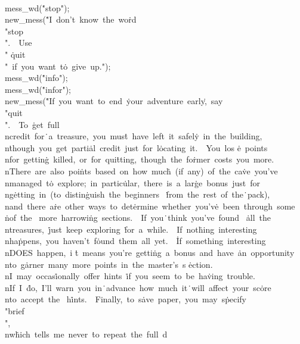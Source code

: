 \\{mess\_wd}(\.{"stop"});\6
\\{new\_mess}(\.{"I\ don't\ know\ the\ wo}\)\.{rd\ \\"stop\\".\ \ Use\ \\"}\)%
\.{quit\\"\ if\ you\ want\ t}\)\.{o\ give\ up."});\6
\\{mess\_wd}(\.{"info"});\5
\\{mess\_wd}(\.{"infor"});\6
\\{new\_mess}(\.{"If\ you\ want\ to\ end\ }\)\.{your\ adventure\ early}\)\.{,\
say\ \\"quit\\".\ \ To\ }\)\.{get\ full\\ncredit\ for}\)\.{\ a\ treasure,\ you\
mus}\)\.{t\ have\ left\ it\ safel}\)\.{y\ in\ the\ building,\\n}\)\.{though\
you\ get\ parti}\)\.{al\ credit\ just\ for\ l}\)\.{ocating\ it.\ \ You\ los}\)%
\.{e\ points\\nfor\ gettin}\)\.{g\ killed,\ or\ for\ qui}\)\.{tting,\ though\
the\ fo}\)\.{rmer\ costs\ you\ more.}\)\.{\\nThere\ are\ also\ poi}\)\.{nts\
based\ on\ how\ muc}\)\.{h\ (if\ any)\ of\ the\ ca}\)\.{ve\ you've\\nmanaged\
t}\)\.{o\ explore;\ in\ partic}\)\.{ular,\ there\ is\ a\ lar}\)\.{ge\ bonus\
just\ for\\ng}\)\.{etting\ in\ (to\ distin}\)\.{guish\ the\ beginners\ }\)%
\.{from\ the\ rest\ of\ the}\)\.{\ pack),\\nand\ there\ a}\)\.{re\ other\ ways\
to\ det}\)\.{ermine\ whether\ you'v}\)\.{e\ been\ through\ some\\}\)\.{nof\ the%
\ more\ harrowi}\)\.{ng\ sections.\ \ If\ you}\)\.{\ think\ you've\ found\ }\)%
\.{all\ the\\ntreasures,\ }\)\.{just\ keep\ exploring\ }\)\.{for\ a\ while.\ \
If\ not}\)\.{hing\ interesting\\nha}\)\.{ppens,\ you\ haven't\ f}\)\.{ound\
them\ all\ yet.\ \ }\)\.{If\ something\ interes}\)\.{ting\\nDOES\ happen,\ i}\)%
\.{t\ means\ you're\ getti}\)\.{ng\ a\ bonus\ and\ have\ }\)\.{an\ opportunity%
\\nto\ g}\)\.{arner\ many\ more\ poin}\)\.{ts\ in\ the\ master's\ s}\)%
\.{ection.\\nI\ may\ occas}\)\.{ionally\ offer\ hints\ }\)\.{if\ you\ seem\ to\
be\ ha}\)\.{ving\ trouble.\\nIf\ I\ }\)\.{do,\ I'll\ warn\ you\ in}\)\.{\
advance\ how\ much\ it}\)\.{\ will\ affect\ your\ sc}\)\.{ore\\nto\ accept\ the%
\ h}\)\.{ints.\ \ Finally,\ to\ s}\)\.{ave\ paper,\ you\ may\ s}\)\.{pecify\ %
\\"brief\\",\\nw}\)\.{hich\ tells\ me\ never\ }\)\.{to\ repeat\ the\ full\ d}\)%

